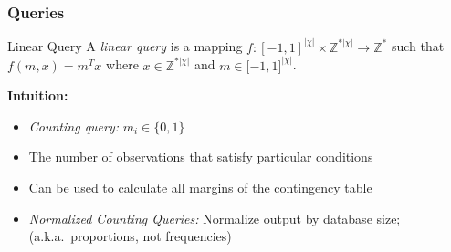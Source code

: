 \begin{frame}[allowframebreaks]%
\frametitle{Queries}
\begin{definition}{Linear Query}
A \textit{linear query} is a mapping $f:[-1,1]^{|\chi |}\times \mathbb{Z}%
^{\ast |\chi |}\rightarrow \mathbb{Z}^{\ast }$ such that $f(m,x)=m^{T}x$
where $x\in \mathbb{Z}^{\ast |\chi |}$ and $m\in \lbrack -1,1]^{|\chi |}$.
\end{definition}

\textbf{Intuition:}
\begin{itemize}
	\item \textit{Counting query:} $m_{i}\in\{0,1\}$
	\item The number of observations that satisfy particular conditions
	\item Can be used to calculate all margins of the contingency table
	\item \textit{Normalized Counting Queries:} Normalize output by database size; (a.k.a.\ proportions, not frequencies)
\end{itemize}

\end{frame}%
%

